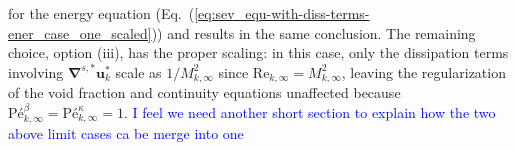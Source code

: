\documentclass[preprint,10pt]{elsarticle}
\newcommand{\gradd}[1]{\mbold{\nabla}^{#1}}
\newcommand{\mbold}[1]{\boldsymbol#1}
\newcommand{\norm}{\textrm{norm}}
\renewcommand{\Re}{\textrm{Re}}
\newcommand{\Pe}{\textrm{P\'e}}
\newcommand{\eqt}[1]{Eq.~(\ref{#1})}                     %
\newcommand{\tcb}[1]{\textcolor{blue}{#1}}
\begin{document}
for the energy equation (\eqt{eq:sev_equ-with-diss-terms-ener_case_one_scaled}) and results in the same conclusion. The remaining 
choice, option (iii), has the proper scaling: in this case, only the dissipation terms involving 
$\gradd{s,*} \mbold u_k^*$ scale as $1/M_{k,\infty}^2$ since $\Re_{k,\infty} = M_{k,\infty}^2$, leaving the 
regularization of the void fraction and continuity equations unaffected because $\Pe_{k,\infty}^\beta = \Pe_{k,\infty}^\kappa =1$.
\tcb{I feel we need another short section to explain how the two above limit cases ca be merge into one}
%
\end{document}

